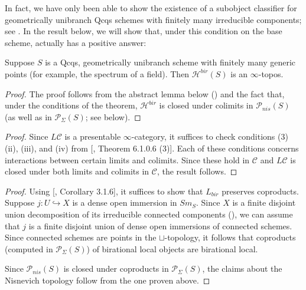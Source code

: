 In fact, we have only been able to show the existence of a subobject classifier for geometrically unibranch Qcqs schemes with finitely many irreducible components; see . In the result below, we will show that, under this condition on the base scheme,  actually has a positive answer:
\begin{thm}\label{Hbir a topos}
    Suppose $S$ is a Qcqs, geometrically unibranch scheme with finitely many generic points (for example, the spectrum of a field). Then $\mathcal{H}^{bir}(S)$ is an $\infty$-topos.
\end{thm}
\begin{proof}
    The proof follows from the abstract lemma below () and the fact that, under the conditions of the theorem, $\mathcal{H}^{bir}$ is closed under colimits in $\mathcal{P}_{nis}(S)$ (as well as in $\mathcal{P}_\Sigma(S)$; see  below).
\end{proof}
\begin{proof}
    Since $L\mathcal{C}$ is a presentable $\infty$-category, it suffices to check conditions (3) (ii), (iii), and (iv) from [\cite{lurie2009higher}, Theorem 6.1.0.6 (3)]. Each of these conditions concerns interactions between certain limits and colimits. Since these hold in $\mathcal{C}$ and $L\mathcal{C}$ is closed under both limits and colimits in $\mathcal{C}$, the result follows.
\end{proof}
\begin{proof}
    Using  [\cite{0bat}, Corollary 3.1.6], it suffices to show that $L_{bir}$ preserves coproducts. Suppose $j:U\hookrightarrow X$ is a dense open immersion in $Sm_S$. Since $X$ is a finite disjoint union decomposition of its irreducible connected components (), we can assume that $j$ is a finite disjoint union of dense open immersions of connected schemes. Since connected schemes are points in the $\sqcup$-topology, it follows that coproducts (computed in $\mathcal{P}_\Sigma(S)$) of birational local objects are birational local.

    Since $\mathcal{P}_{nis}(S)$ is closed under coproducts in $\mathcal{P}_\Sigma(S)$, the claims about the Nisnevich topology follow from the one proven above.
\end{proof}

